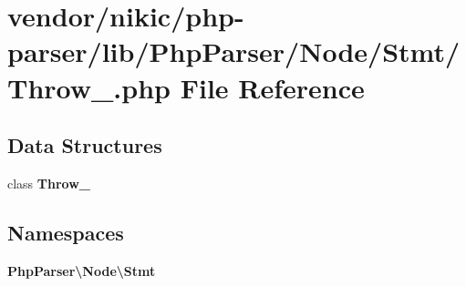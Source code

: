 \section{vendor/nikic/php-\/parser/lib/\+Php\+Parser/\+Node/\+Stmt/\+Throw\+\_\+.php File Reference}
\label{_throw___8php}
\subsection*{Data Structures}
\begin{DoxyCompactItemize}
\item 
class {\bf Throw\+\_\+}
\end{DoxyCompactItemize}
\subsection*{Namespaces}
\begin{DoxyCompactItemize}
\item 
 {\bf Php\+Parser\textbackslash{}\+Node\textbackslash{}\+Stmt}
\end{DoxyCompactItemize}
